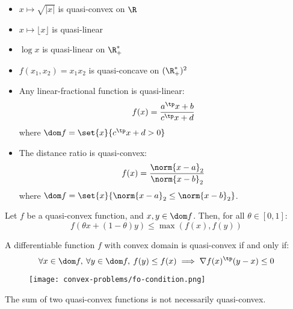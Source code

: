 \begin{example}$ $
    \begin{itemize}
        \item $x\mapsto \sqrt{|x|}$ is quasi-convex on $\R$
        \item $x\mapsto \lfloor x\rfloor$ is quasi-linear
        \item $\log x$ is quasi-linear on $\R_+^*$
        \item $f(x_1, x_2) = x_1x_2$ is quasi-concave on $(\R_+^*)^2$
        \item Any linear-fractional function is quasi-linear:
        \begin{equation*}
            f(x)=\frac{a^\tp x+b}{c^\tp x+d}
        \end{equation*}
        where $\dom f = \set{x}{c^\tp x+d>0}$
        \item The distance ratio is quasi-convex:
        \begin{equation*}
            f(x) = \frac{\norm{x-a}_2}{\norm{x-b}_2}
        \end{equation*}
        where $\dom f = \set{x}{\norm{x-a}_2\leq\norm{x-b}_2}$.
    \end{itemize}
\end{example}

\begin{property}
    Let $f$ be a quasi-convex function, and $x, y\in\dom f$. Then, for all $\theta\in[0,1]$:
    \begin{equation*}
        f(\theta x+(1-\theta)y)\leq\max(f(x), f(y))
    \end{equation*}
\end{property}

\begin{property}
    A differentiable function $f$ with convex domain is quasi-convex if and only if:
    \begin{equation*}
        \forall x\in\dom f, \: \forall y\in\dom f, \: f(y)\leq f(x) \implies \nabla f(x)^\tp (y-x)\leq 0
    \end{equation*}
    \begin{figure}[H]
        \centering
        \texttt{[image: convex-problems/fo-condition.png]}
    \end{figure}
\end{property}

\begin{remark}
    The sum of two quasi-convex functions is not necessarily quasi-convex.
\end{remark}


